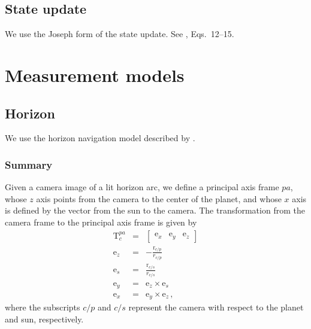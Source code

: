\documentclass[12pt]{article}
\newcommand{\Tf}[2]{\ensuremath{\mathrm{T}_{#1}^{#2}}}
\newcommand{\vecr}{\ensuremath{\mathrm{r}}}
\begin{document}
\subsection{State update}
We use the Joseph form of the state update. See \citet{Bishop2016}, Eqs.~12--15.

\section{Measurement models}
\subsection{Horizon}
We use the horizon navigation model described by \citet{Christian2017}.

\subsubsection{Summary}
Given a camera image of a lit horizon arc, we define a principal axis frame $pa$, whose $z$ axis points from the camera to the center of the planet, and whose $x$ axis is defined by the vector from the sun to the camera. The transformation from the camera frame to the principal axis frame is given by 
\begin{eqnarray}
\Tf{c}{pa} &=& \begin{bmatrix} \mathrm{e}_x & \mathrm{e}_y & \mathrm{e}_z \end{bmatrix} \\
\mathrm{e}_z &=& -\frac{\vecr_{c/p}}{r_{c/p}} \\
\mathrm{e}_s &=& \frac{\vecr_{c/s}}{r_{c/s}} \\
\mathrm{e}_y &=& \mathrm{e}_z \times \mathrm{e}_s \\
\mathrm{e}_x &=& \mathrm{e}_y \times \mathrm{e}_z\,\text{,}
\end{eqnarray}
where the subscripts $c/p$ and $c/s$ represent the camera with respect to the planet and sun, respectively.
\end{document}
